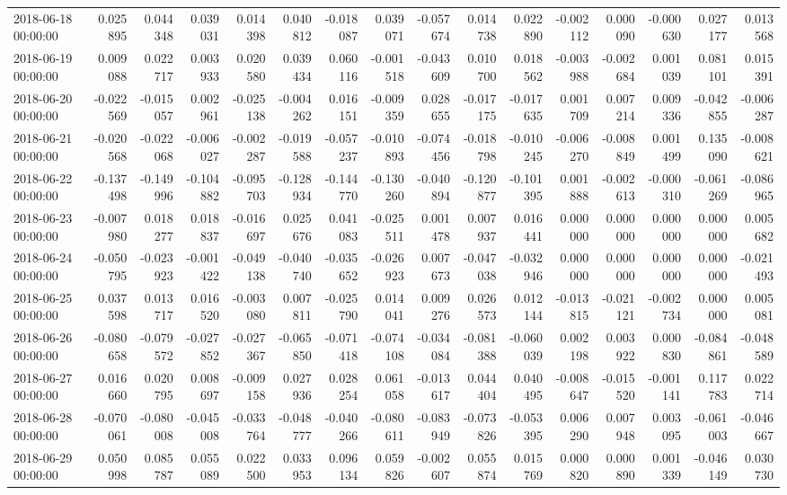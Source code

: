 \begin{tabular}{lrrrrrrrrrrrrrrr}
2018-06-18 00:00:00 & 0.025895 & 0.044348 & 0.039031 & 0.014398 & 0.040812 & -0.018087 & 0.039071 & -0.057674 & 0.014738 & 0.022890 & -0.002112 & 0.000090 & -0.000630 & 0.027177 & 0.013568 \\
2018-06-19 00:00:00 & 0.009088 & 0.022717 & 0.003933 & 0.020580 & 0.039434 & 0.060116 & -0.001518 & -0.043609 & 0.010700 & 0.018562 & -0.003988 & -0.002684 & 0.001039 & 0.081101 & 0.015391 \\
2018-06-20 00:00:00 & -0.022569 & -0.015057 & 0.002961 & -0.025138 & -0.004262 & 0.016151 & -0.009359 & 0.028655 & -0.017175 & -0.017635 & 0.001709 & 0.007214 & 0.009336 & -0.042855 & -0.006287 \\
2018-06-21 00:00:00 & -0.020568 & -0.022068 & -0.006027 & -0.002287 & -0.019588 & -0.057237 & -0.010893 & -0.074456 & -0.018798 & -0.010245 & -0.006270 & -0.008849 & 0.001499 & 0.135090 & -0.008621 \\
2018-06-22 00:00:00 & -0.137498 & -0.149996 & -0.104882 & -0.095703 & -0.128934 & -0.144770 & -0.130260 & -0.040894 & -0.120877 & -0.101395 & 0.001888 & -0.002613 & -0.000310 & -0.061269 & -0.086965 \\
2018-06-23 00:00:00 & -0.007980 & 0.018277 & 0.018837 & -0.016697 & 0.025676 & 0.041083 & -0.025511 & 0.001478 & 0.007937 & 0.016441 & 0.000000 & 0.000000 & 0.000000 & 0.000000 & 0.005682 \\
2018-06-24 00:00:00 & -0.050795 & -0.023923 & -0.001422 & -0.049138 & -0.040740 & -0.035652 & -0.026923 & 0.007673 & -0.047038 & -0.032946 & 0.000000 & 0.000000 & 0.000000 & 0.000000 & -0.021493 \\
2018-06-25 00:00:00 & 0.037598 & 0.013717 & 0.016520 & -0.003080 & 0.007811 & -0.025790 & 0.014041 & 0.009276 & 0.026573 & 0.012144 & -0.013815 & -0.021121 & -0.002734 & 0.000000 & 0.005081 \\
2018-06-26 00:00:00 & -0.080658 & -0.079572 & -0.027852 & -0.027367 & -0.065850 & -0.071418 & -0.074108 & -0.034084 & -0.081388 & -0.060039 & 0.002198 & 0.003922 & 0.000830 & -0.084861 & -0.048589 \\
2018-06-27 00:00:00 & 0.016660 & 0.020795 & 0.008697 & -0.009158 & 0.027936 & 0.028254 & 0.061058 & -0.013617 & 0.044404 & 0.040495 & -0.008647 & -0.015520 & -0.001141 & 0.117783 & 0.022714 \\
2018-06-28 00:00:00 & -0.070061 & -0.080008 & -0.045008 & -0.033764 & -0.048777 & -0.040266 & -0.080611 & -0.083949 & -0.073826 & -0.053395 & 0.006290 & 0.007948 & 0.003095 & -0.061003 & -0.046667 \\
2018-06-29 00:00:00 & 0.050998 & 0.085787 & 0.055089 & 0.022500 & 0.033953 & 0.096134 & 0.059826 & -0.002607 & 0.055874 & 0.015769 & 0.000820 & 0.000890 & 0.001339 & -0.046149 & 0.030730 \\

\end{tabular}
